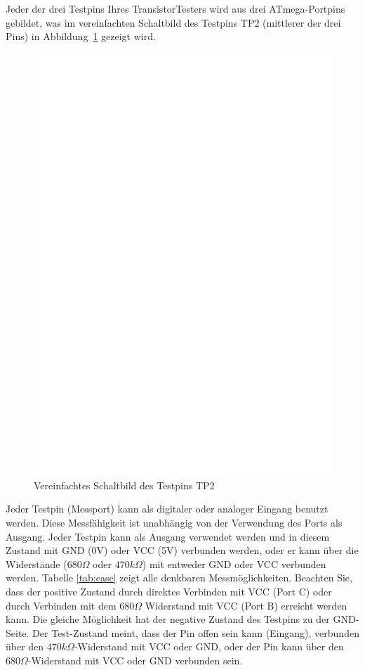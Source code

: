 Jeder der drei Testpins Ihres TransistorTesters wird aus drei ATmega-Portpins gebildet,
was im vereinfachten Schaltbild des Testpins TP2 (mittlerer der drei Pins) in Abbildung~\ref{fig:terminal} gezeigt wird.

\begin{figure}[H]
\centering
\includegraphics[]{../FIG/terminal.eps}
\caption{Vereinfachtes Schaltbild des Testpins TP2}
\label{fig:terminal}
\end{figure}

Jeder Testpin (Messport) kann als digitaler oder analoger Eingang benutzt werden.
Diese Mess\-fähig\-keit ist un\-abhän\-gig von der Verwendung des Ports als Ausgang.
Jeder Testpin kann als Ausgang verwendet werden und in diesem Zustand mit GND (0V) oder VCC (5V) verbunden werden,
oder er kann über die Widerstände (\(680\Omega\) oder \(470k\Omega\)) mit entweder GND oder VCC verbunden werden.
Tabelle \ref{tab:case} zeigt alle denkbaren Messmöglichkeiten.
Beachten Sie, dass der positive Zustand durch direktes Verbinden mit VCC (Port C) oder
durch Verbinden mit dem \(680\Omega\) Widerstand mit VCC (Port B) erreicht werden kann.
Die gleiche Möglichkeit hat der negative Zustand des Testpins zu der GND-Seite.
Der Test-Zustand meint, dass der Pin offen sein kann (Eingang), verbunden über den \(470k\Omega\)-Widerstand
mit VCC oder GND, oder der Pin kann über den \(680\Omega\)-Widerstand mit VCC oder GND verbunden sein.

